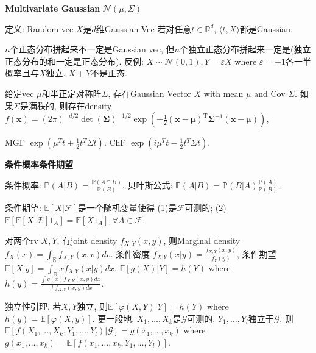 \documentclass[UTF8]{ctexart}
\begin{document}
\noindent \textbf{Multivariate Gaussian} $\mathcal{N}(\mu,\Sigma)$

定义: Random vec $X$是$d$维Gaussian Vec 若对任意$t\in\mathbb{R}^d$, $\langle t,X \rangle $都是Gaussian.

$n$个正态分布拼起来不一定是Gaussian vec, 但$n$个独立正态分布拼起来一定是(独立正态分布的和一定是正态分布).
反例: $X\sim\mathcal{N}(0,1), Y=\varepsilon X$ where $\varepsilon=\pm 1$各一半概率且与$X$独立. $X+Y$不是正态. 

给定vec $\mu$和半正定对称阵$\Sigma$, 存在Gaussian Vector $X$ with mean $\mu$ and Cov $\Sigma$.
如果$\Sigma$是满秩的, 则存在density
$f(\mathbf{x}) = (2 \pi)^{-d / 2} \operatorname{det}(\boldsymbol{\Sigma})^{-1 / 2} \exp \left(-\frac{1}{2}(\mathbf{x}-\boldsymbol{\mu})^{\mathrm{T}} \boldsymbol{\Sigma}^{-1}(\mathbf{x}-\boldsymbol{\mu})\right)$,

MGF  $\exp \left( \mu^T t + \frac{1}{2} t^T \Sigma t \right)$.
ChF $\exp \left( i \mu^T t - \frac{1}{2} t^T \Sigma t \right)$.

\noindent \textbf{条件概率条件期望}

条件概率: $\mathbb{P}(A|B)=\frac{\mathbb{P}(A\cap B)}{\mathbb{P}(B)}$.
贝叶斯公式: $\mathbb{P}(A|B) = \mathbb{P}(B|A) \frac{\mathbb{P}(A)}{\mathbb{P}(B)}$.

条件期望:
$\mathbb{E}[X|\mathcal{F}]$是一个随机变量使得
(1)是$\mathcal{F}$可测的;
(2)$\mathbb{E}[\mathbb{E}[X|\mathcal{F}]1_A]=\mathbb{E}[X 1_A], \forall A \in\mathcal{F}$.

对两个rv $X,Y$, 有joint density $f_{X,Y}(x,y)$, 则Marginal density $f_X(x)=\int_{\mathbb{R}} f_{X,Y}(x,v)dv$.
条件密度 $f_{X|Y}(x|y) = \frac{f_{X,Y}(x,y)}{f_Y(y)}$,
条件期望 $\mathbb{E}[X|y]=\int_{\mathbb{R}}xf_{X|Y}(x|y)dx$.
$\mathbb{E}[g(X)|Y]=h(Y)$ where
$h(y) = \frac{\int g(x)f_{X,Y}(x,y)dx}{\int f_{X,Y}(x,y)dx}$.

独立性引理. 若$X, Y$独立, 则$\mathbb{E}[\varphi(X,Y)|Y]=h(Y)$ where
$h(y)=\mathbb{E}[\varphi(X,y)]$.
更一般地, $X_1,\dots,X_k$是$\mathcal{G}$可测的, $Y_1,\dots,Y_l$独立于$\mathcal{G}$,
则$\mathbb{E}[f(X_1,\dots,X_k,Y_1,\dots,Y_l)|\mathcal{G}]=g(x_1,\dots,x_k)$
where $g(x_1,\dots,x_k)=\mathbb{E}[f(x_1,\dots,x_k,Y_1,\dots,Y_l)]$.
\end{document}
